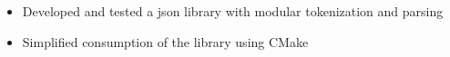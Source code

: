 
\begin{itemize}
  \item Developed and tested a json library with modular tokenization and parsing
  \item Simplified consumption of the library using CMake
\end{itemize}
